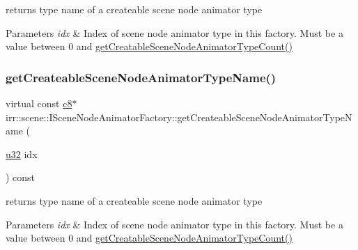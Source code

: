 returns type name of a createable scene node animator type 


\begin{DoxyParams}{Parameters}
{\em idx} & Index of scene node animator type in this factory. Must be a value between 0 and \hyperlink{classirr_1_1scene_1_1ISceneNodeAnimatorFactory_a7b6f10b1e602714652636763e8617691}{get\+Creatable\+Scene\+Node\+Animator\+Type\+Count()} \\
\hline
\end{DoxyParams}
\mbox{\label{classirr_1_1scene_1_1ISceneNodeAnimatorFactory_af33905c1ad6cd478bfbcbda33c82e3bd}} 
\subsubsection{\texorpdfstring{get\+Createable\+Scene\+Node\+Animator\+Type\+Name()}{getCreateableSceneNodeAnimatorTypeName()}\hspace{0.1cm}{\footnotesize\ttfamily [2/4]}}
{\footnotesize\ttfamily virtual const \hyperlink{namespaceirr_a9395eaea339bcb546b319e9c96bf7410}{c8}$\ast$ irr\+::scene\+::\+I\+Scene\+Node\+Animator\+Factory\+::get\+Createable\+Scene\+Node\+Animator\+Type\+Name (\begin{DoxyParamCaption}\item[{\hyperlink{namespaceirr_a0416a53257075833e7002efd0a18e804}{u32}}]{idx }\end{DoxyParamCaption}) const\hspace{0.3cm}{\ttfamily [pure virtual]}}



returns type name of a createable scene node animator type 


\begin{DoxyParams}{Parameters}
{\em idx} & Index of scene node animator type in this factory. Must be a value between 0 and \hyperlink{classirr_1_1scene_1_1ISceneNodeAnimatorFactory_a7b6f10b1e602714652636763e8617691}{get\+Creatable\+Scene\+Node\+Animator\+Type\+Count()} \\
\hline
\end{DoxyParams}
\mbox{\label{classirr_1_1scene_1_1ISceneNodeAnimatorFactory_a905e896d9fbb0821dd4bf4214b786116}} 
